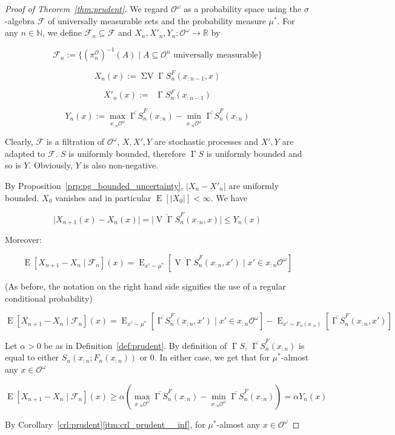 \documentclass[11pt]{article}
\theoremstyle{definition}
\theoremstyle{plain}
\newcommand{\Nats}{\mathbb{N}}
\newcommand{\Reals}{\mathbb{R}}
\newcommand{\A}[1]{\lvert #1 \rvert}
\DeclareMathOperator{\E}{E}
\newcommand{\Ob}{\mathcal{O}}
\newcommand{\OO}{\Ob^\omega}
\newcommand{\PO}{\pi^\Ob}
\DeclareMathOperator{\V}{V}
\DeclareMathOperator{\SV}{\Sigma V}
\DeclareMathOperator{\SVM}{\Sigma V_{\min}}
\DeclareMathOperator{\PG}{\Gamma}
\newcommand{\F}{\mathcal{F}}
\begin{document}
\begin{proof}[Proof of Theorem~\ref{thm:prudent}]

We regard ${\OO}$ as a probability space using the ${\sigma}$-algebra $\F$ of universally measurable sets and the probability measure ${\mu^*}$. For any ${n \in \Nats}$, we define ${\F_n \subseteq \F}$ and $X_n,X'_n,Y_n: \OO \rightarrow \Reals$ by 

$$\F_n := \{(\PO_n)^{-1}(A) \mid A \subseteq \Ob^n \text{ universally measurable}\}$$

$$X_n(x):= \SV \PG{S}^F_{n}(x_{:n-1},x)$$

$$X'_n(x):= \SVM \PG{S}^F_{n}(x_{:n-1})$$

$$Y_n(x):=\max_{x_{:n}\OO} \overline{\PG{S}}^F_{n}(x_{:n}) - \min_{x_{:n}\OO} \overline{\PG{S}}^F_{n}(x_{:n})$$

Clearly, ${\F}$ is a filtration of ${\OO}$, ${X,X',Y}$ are stochastic processes and ${X',Y}$ are adapted to ${\F}$. ${S}$ is uniformly bounded, therefore ${\PG{S}}$  is uniformly bounded and so is ${Y}$. Obviously, ${Y}$ is also non-negative.

By Proposition~\ref{prp:pg_bounded_uncertainty}, ${\A{X_n-X'_n}}$ are uniformly bounded. ${X_0}$ vanishes and in particular ${\E[\A{X_0}] < \infty}$. We have

$$\A{X_{n+1}(x)-X_n(x)} = \A{\overline{\V{\PG{S}}}_{n}^F(x_{:n},x)} \leq Y_n(x)$$

Moreover:

$$\E[X_{n+1} - X_n \mid \F_n](x) = \E_{x' \sim \mu^*}[\overline{\V{\PG{S}}}_{n}^F(x_{:n},x') \mid x' \in x_{:n}\OO]$$

(As before, the notation on the right hand side signifies the use of a regular conditional probability)

$$\E[X_{n+1} - X_n \mid \F_n](x) = \E_{x' \sim \mu^*}[\overline{\PG{S}}_{n}^F(x_{:n},x') \mid x' \in x_{:n}\OO] - \E_{x' \sim F_n(x_{:n})}[\overline{\PG{S}}_{n}^F(x_{:n},x')]$$

Let $\alpha > 0$ be as in Definition~\ref{def:prudent}. By definition of $\PG{S}$, $\overline{\PG{S}}_{n}^F(x_{:n})$ is equal to either $S_n(x_{:n};F_n(x_{:n}))$ or 0. In either case, we get that for $\mu^*$-almost any $x \in \OO$

$$\E[X_{n+1} - X_n \mid \F_n](x) \geq \alpha (\max_{x_{:n}\OO} \overline{\PG{S}}_{n}^F(x_{:n}) - \min_{x_{:n}\OO} \overline{\PG{S}}_{n}^F(x_{:n})) = \alpha Y_n(x)$$

By Corollary~\ref*{crl:prudent}\ref{itm:crl_prudent__inf}, for $\mu^*$-almost any $x \in \OO$


\end{proof}
\end{document}
